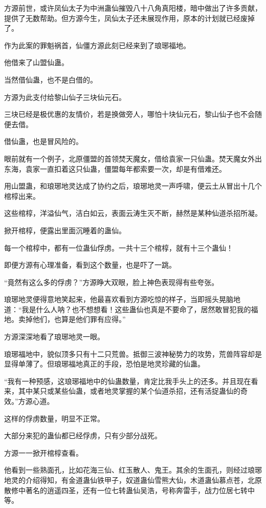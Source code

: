 \begin{this_body}
方源前世，或许凤仙太子为中洲蛊仙摧毁八十八角真阳楼，暗中做出了许多贡献，提供了无数帮助。但方源今生，凤仙太子还未展现作用，原本的计划就已经废掉了。

作为此案的罪魁祸首，仙僵方源此刻已经来到了琅琊福地。

他借来了山盟仙蛊。

当然借仙蛊，也不是白借的。

方源为此支付给黎山仙子三块仙元石。

三块已经是极优惠的友情价，若是换做旁人，哪怕十块仙元石，黎山仙子也不会随便去借。

借仙蛊，也是冒风险的。

眼前就有一个例子，北原僵盟的首领焚天魔女，借给袁家一只仙蛊。焚天魔女外出东海，袁家一直扣着这只仙蛊，僵盟每年都索要一次，却是有借难还。

用山盟蛊，和琅琊地灵达成了协约之后，琅琊地灵一声呼啸，便云土从冒出十几个棺椁出来。

这些棺椁，洋溢仙气，洁白如云，表面云涛生灭不断，赫然是某种仙道杀招所凝。

掀开棺椁，便露出里面沉睡着的蛊仙。

每一个棺椁中，都有一位蛊仙俘虏。一共十三个棺椁，就有十三个蛊仙！

即便方源有心理准备，看到这个数量，也是吓了一跳。

“竟然有这么多的俘虏？”方源睁大双眼，脸上神色表现得有些夸张。

琅琊地灵便得意地笑起来，他最喜欢看到方源吃惊的样子，当即摇头晃脑地道：“我是什么人呐？也不想想看！这些蛊仙也真是不要命了，居然敢冒犯我的福地。卖掉他们，也算是他们罪有应得。”

方源深深地看了琅琊地灵一眼。

琅琊福地中，貌似顶多只有十二只荒兽。抵御三波神秘势力的攻势，荒兽阵容却是显得单薄了。但琅琊福地真正的手段，恐怕是地灵珍藏的仙蛊。

“我有一种预感，这琅琊福地中的仙蛊数量，肯定比我手头上的还多。并且现在看来，其中某只或某些仙蛊，或者地灵掌握的某个仙道杀招，还有活捉蛊仙的奇效。”方源心道。

这样的俘虏数量，明显不正常。

大部分来犯的蛊仙都已经俘虏，只有少部分战死。

方源一一掀开棺椁查看。

他看到一些熟面孔，比如花海三仙、红玉散人、鬼王。其余的生面孔，则经过琅琊地灵的介绍得知，有金道蛊仙铁甲子，奴道蛊仙雪熊大仙，木道蛊仙慕点苍，北原散修中著名的逍遥四圣，还有一位七转蛊仙吴浩，号称奔雷手，战力位居七转中等。


\end{this_body}
